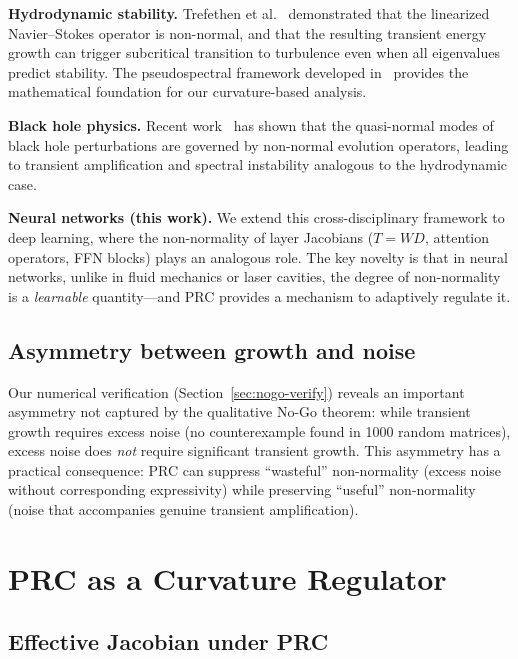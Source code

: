\documentclass[11pt,a4paper]{article}
\theoremstyle{definition}
\begin{document}
\textbf{Hydrodynamic stability.}
Trefethen et al.~\cite{trefethen1993} demonstrated that the linearized
Navier--Stokes operator is non-normal, and that the resulting transient
energy growth can trigger subcritical transition to turbulence even when
all eigenvalues predict stability. The pseudospectral framework
developed in~\cite{trefethen2005} provides the mathematical foundation
for our curvature-based analysis.

\textbf{Black hole physics.}
Recent work~\cite{jaramillo2021} has shown that the quasi-normal modes
of black hole perturbations are governed by non-normal evolution
operators, leading to transient amplification and spectral instability
analogous to the hydrodynamic case.

\textbf{Neural networks (this work).}
We extend this cross-disciplinary framework to deep learning, where
the non-normality of layer Jacobians ($T = WD$, attention operators,
FFN blocks) plays an analogous role. The key novelty is that in neural
networks, unlike in fluid mechanics or laser cavities, the degree of
non-normality is a \emph{learnable} quantity---and PRC provides a
mechanism to adaptively regulate it.

\subsection{Asymmetry between growth and noise}

Our numerical verification (Section~\ref{sec:nogo-verify}) reveals
an important asymmetry not captured by the qualitative No-Go theorem:
while transient growth requires excess noise (no counterexample found
in 1000 random matrices), excess noise does \emph{not} require
significant transient growth. This asymmetry has a practical
consequence: PRC can suppress ``wasteful'' non-normality (excess
noise without corresponding expressivity) while preserving ``useful''
non-normality (noise that accompanies genuine transient amplification).

\section{PRC as a Curvature Regulator}
\label{sec:curvature-regulation}

\subsection{Effective Jacobian under PRC}
\end{document}
